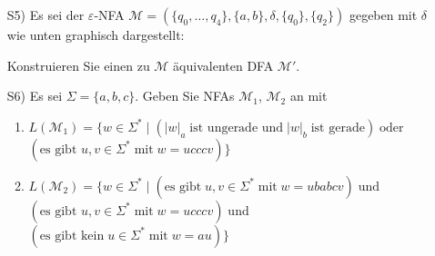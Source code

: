 \begin{exercise}
  \begin{enumerate}
  \item[S5)] Es sei der $\varepsilon$-NFA
    $\mathcal M=(\{q_0,\ldots ,q_4\},\{a,b\}, \delta , \{q_0\}, \{q_2\})$
    gegeben mit $\delta$ wie unten graphisch dargestellt:\\[1ex]
    \begin{center}
      
    \end{center}
    Konstruieren Sie einen zu $\mathcal M$ äquivalenten DFA $\mathcal M'$.
  \item[S6)] Es sei $\Sigma = \{a,b,c\}$. Geben Sie NFAs ${\mathcal{M}}_1$,
    ${\mathcal{M}}_2$ an mit
    \begin{enumerate}
    \item $L({\mathcal{M}}_1)=\{w\in \Sigma^* \mid (|w|_a \;\text{ist ungerade und}\;|w|_b \;\text{ist gerade}) \;\text{oder}$\\[0.5ex]
      \hspace*{3.245cm}$(\text{es gibt }u,v\in \Sigma^* \;\text{mit} \;w = u ccc v) \}$
    \item $L({\mathcal{M}}_2) =  \{w\in \Sigma^* \mid (\text{es gibt} \;u,v\in \Sigma^* \;\text{mit}\; w = u babc v)\;\text{und}$\\[0.5ex]
      \hspace*{3.28cm}$(\text{es gibt }u,v\in \Sigma^* \;\text{mit}\; w = u ccc v ) \;\text{und}$\\[0.5ex]
      \hspace*{3.3cm}$(\text{es gibt kein}\;u \in \Sigma^* \;\text{mit}\; w = au)\}$
    \end{enumerate}
  \end{enumerate}
\end{exercise}
